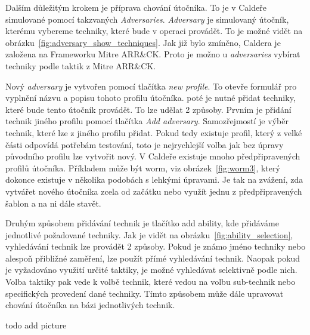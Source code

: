 
Dalším důležitým krokem je příprava chování útočníka.
To je v Caldeře simulované pomocí takzvaných \textit{Adversaries}.
\textit{Adversary} je simulovaný útočník, kterému vybereme techniky, které bude v operaci provádět.
To je možné vidět na obrázku~\ref{fig:adversary_show_techniques}.
Jak již bylo zmíněno, Caldera je založena na Frameworku Mitre ARR\&CK\@.
Proto je možno u \textit{adversaries} vybírat techniky podle taktik z Mitre ARR\&CK\@.


\noindent
Nový \textit{adversary} je vytvořen pomocí tlačítka \textit{new profile}.
To otevře formulář pro vyplnění názvu a popisu tohoto profilu útočníka.
poté je nutné přidat techniky, které bude tento útočník provádět.
To lze udělat 2 způsoby.
Prvním je přidání  technik jiného profilu pomocí tlačítka \textit{Add adversary}.
Samozřejmostí je výběr technik, které lze z jiného profilu přidat.
Pokud tedy existuje profil, který z velké části odpovídá potřebám testování, toto je nejrychlejší volba jak bez úpravy původního profilu lze vytvořit nový.
V Caldeře existuje mnoho předpřipravených profilů útočníka.
Příkladem může být worm, viz obrázek~\ref{fig:worm3}, který dokonce existuje v několika podobách s lehkými úpravami.
Je tak na zvážení, zda vytvářet nového útočníka zcela od začátku nebo využít jednu z předpřipravených šablon a na ni dále stavět.



Druhým způsobem přidávání technik je tlačítko add ability, kde přidáváme jednotlivé požadované techniky.
Jak je vidět na obrázku~\ref{fig:ability_selection}, vyhledávání technik lze provádět 2 způsoby.
Pokud je známo jméno techniky nebo alespoň přibližné zaměření, lze použít přímé vyhledávání technik.
Naopak pokud je vyžadováno využití určité taktiky, je možné vyhledávat selektivně podle nich.
Volba taktiky pak vede k volbě technik, které vedou na volbu sub-technik nebo specifických provedení dané techniky.
Tímto způsobem může dále upravovat chování útočníka na bázi jednotlivých technik.

todo add picture\label{fig:ability_selection}

